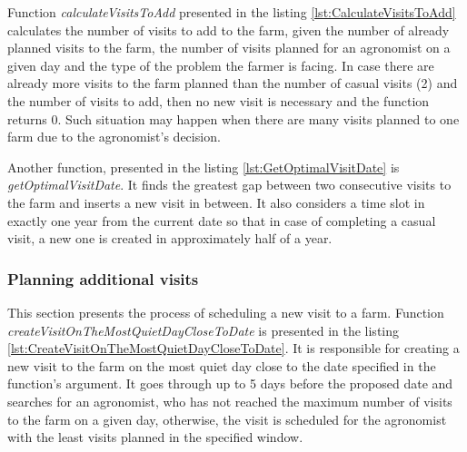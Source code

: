 Function \textit{calculateVisitsToAdd} presented in the listing \ref{lst:CalculateVisitsToAdd} calculates the number of visits to add to the farm, given the number of already planned visits to the farm, the number of visits planned for an agronomist on a given day and the type of the problem the farmer is facing. In case there are already more visits to the farm planned than the number of casual visits (2) and the number of visits to add, then no new visit is necessary and the function returns 0. Such situation may happen when there are many visits planned to one farm due to the agronomist's decision.



Another function, presented in the listing \ref{lst:GetOptimalVisitDate} is \textit{getOptimalVisitDate}. It finds the greatest gap between two consecutive visits to the farm and inserts a new visit in between. It also considers a time slot in exactly one year from the current date so that in case of completing a casual visit, a new one is created in approximately half of a year.



\subsubsection*{Planning additional visits}

This section presents the process of scheduling a new visit to a farm. Function \textit{createVisitOnTheMostQuietDayCloseToDate} is presented in the listing \ref{lst:CreateVisitOnTheMostQuietDayCloseToDate}. It is responsible for creating a new visit to the farm on the most quiet day close to the date specified in the function's argument. It goes through up to 5 days before the proposed date and searches for an agronomist, who has not reached the maximum number of visits to the farm on a given day, otherwise, the visit is scheduled for the agronomist with the least visits planned in the specified window.



